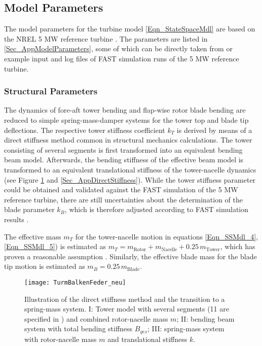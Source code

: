 \documentclass[a4paper]{article}
\begin{document}
\subsection{\label{Sec_ModelParameters}Model Parameters}

The model parameters for the turbine model \eqref{Eqn_StateSpaceMdl} are based on the NREL 5 MW reference turbine \cite{Jonkman:2009}. The parameters are listed in \ref{Sec_AppModelParameters}, some of which can be directly taken from \cite{Jonkman:2009} or example input and log files of FAST simulation runs of the 5 MW reference turbine.



\subsubsection{\label{Sec_StructParameters}Structural Parameters}

The dynamics of fore-aft tower bending and flap-wise rotor blade bending are reduced to simple spring-mass-damper systems for the tower top and blade tip deflections. The respective tower stiffness coefficient $k_T$ is derived by means of a direct stiffness method common in structural mechanics calculations. The tower consisting of several segments is first transformed into an equivalent bending beam model. Afterwards, the bending stiffness of the effective beam model is transformed to an equivalent translational stiffness of the tower-nacelle dynamics (see Figure \ref{Fig_TurmBalkenFeder} and \ref{Sec_AppDirectStiffness}).
\newline While the tower stiffness parameter could be obtained and validated against the FAST simulation of the 5 MW reference turbine, there are still uncertainties about the determination of the blade parameter $k_B$, which is therefore adjusted according to FAST simulation results \cite{Georg:Fuzz2012}.

The effective mass $m_T$ for the tower-nacelle motion in equations \eqref{Eqn_SSMdl_4}, \eqref{Eqn_SSMdl_5}) is estimated as
\newline $m_T = m_\text{Rotor} + m_\text{Nacelle} + 0.25 \,m_\text{Tower}$, which has proven a reasonable assumption \cite{Gasch_eng:2012}. Similarly, the effective blade mass for the blade tip motion is estimated as $m_B = 0.25 \,m_\text{Blade}$.

\begin{figure}
\centering
\texttt{[image: TurmBalkenFeder\_neu]}
\caption{Illustration of the direct stiffness method and the transition to a spring-mass system. I:
Tower model with several segments (11 are specified in \cite{Jonkman:2009}) and combined rotor-nacelle mass $m$; II: bending beam system with total
bending stiffness $B_{ges}$; III: spring-mass system with rotor-nacelle mass $m$ and translational stiffness $k$.}
\label{Fig_TurmBalkenFeder}
\end{figure}
\end{document}
